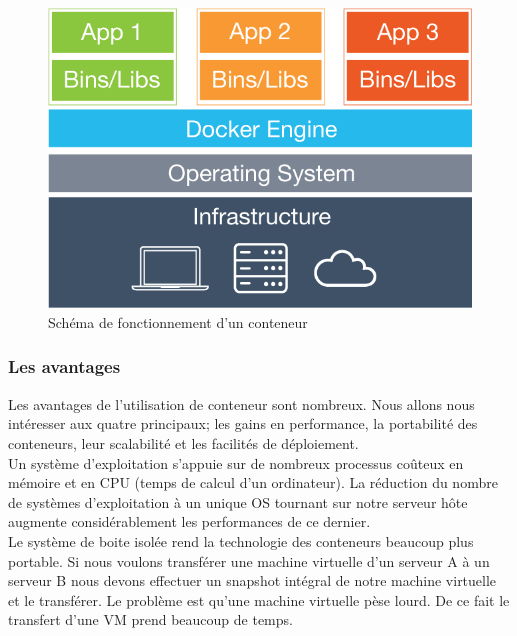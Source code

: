       \begin{figure}
        \begin{center}
          \includegraphics[scale=0.2]{images/container.png}
        \end{center}
        \caption{Schéma de fonctionnement d'un conteneur}
        \label{Container}
      \end{figure}

      \subsubsection{Les avantages}
      Les avantages de l’utilisation de conteneur sont nombreux. Nous allons nous intéresser aux quatre principaux; les gains en performance, la portabilité des conteneurs, leur scalabilité et les facilités de déploiement.\\

      Un système d’exploitation s’appuie sur de nombreux processus coûteux en mémoire et en \gls{CPU} (temps de calcul d’un ordinateur). La réduction du nombre de systèmes d’exploitation à un unique OS tournant sur notre serveur hôte augmente considérablement les performances de ce dernier.\\

      Le système de boite isolée rend la technologie des conteneurs beaucoup plus portable. Si nous voulons transférer une machine virtuelle d’un serveur A à un serveur B nous devons effectuer un snapshot intégral de notre machine virtuelle et le transférer. Le problème est qu’une machine virtuelle pèse lourd. De ce fait le transfert d’une VM prend beaucoup de temps.\\

